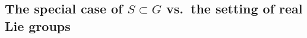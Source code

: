 \documentclass{article}
\def\C{\mathbb{C}}
\theoremstyle{definition}
\numberwithin{equation}{subsection}
\renewcommand{\-}{\hyp{}}
\begin{document}
\subsection{\texorpdfstring{The special case of $S \subset G$ vs.\ the setting of real Lie groups}{}}

\end{document}
